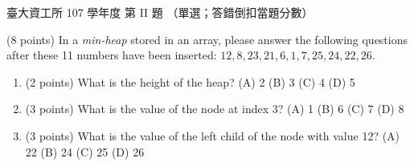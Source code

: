 \begin{pastexam}[label={px:ntu-107-dsa-02}]{臺大資工所 107 學年度 第 II 題}
（單選；答錯倒扣當題分數）

(8 points) In a \textit{min-heap} stored in an array, please answer the following questions after these 11
numbers have been inserted: $12,8,23,21,6,1,7,25,24,22,26$.
\begin{enumerate}[label=\textbf{\arabic*.}, start=8]
\item (2 points) What is the height of the heap? (A) 2 (B) 3 (C) 4 (D) 5
\item (3 points) What is the value of the node at index 3? (A) 1 (B) 6 (C) 7 (D) 8
\item (3 points) What is the value of the left child of the node with value 12? (A) 22 (B) 24
(C) 25 (D) 26
\end{enumerate}
\end{pastexam}

